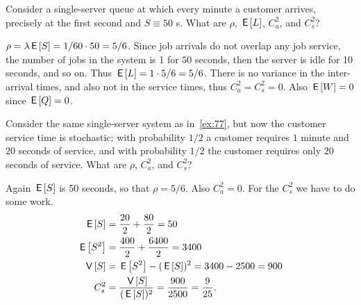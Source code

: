 \begin{exercise}\label{ex:77}
 Consider  a single-server queue at which every minute a customer arrives, precisely at the first second and $S\equiv 50$ s.
 What are $\rho$, $\,\mathsf{E}\left[L\right]$, $C_a^2$, and $C_s^2$?
\begin{solution}
 $\rho = \lambda \,\mathsf{E}\left[S\right] = 1/60 \cdot 50 = 5/6$.
 Since job arrivals do not overlap any job service, the number of jobs in the system is 1 for $50$ seconds, then the server is idle for 10 seconds, and so on.
 Thus $\,\mathsf{E}\left[L\right] = 1\cdot5/6 = 5/6$.
 There is no variance in the inter-arrival times, and also not in the service times, thus $C_a^2 = C_s^2 = 0$.
 Also $\,\mathsf{E}\left[W\right]=0$ since $\,\mathsf{E}\left[Q\right]=0$.
\end{solution}
\end{exercise}

\begin{exercise}\label{ex:76}
 Consider the same single-server system as in~\cref{ex:77}, but now the customer service time is stochastic: with probability $1/2$ a customer requires $1$ minute and $20$ seconds of service, and with probability $1/2$ the customer requires only $20$ seconds of service.
 What are $\rho$, $C_a^2$, and $C_s^2$?
\begin{solution}
 Again $\,\mathsf{E}\left[S\right]$ is 50 seconds, so that $\rho = 5/6$. Also
 $C_a^2=0$. For the $C_s^2$ we have to do some work.
 \begin{equation*}
 \begin{split}
 \,\mathsf{E}\left[S\right] &= \frac{20}2 + \frac{80}2 = 50 \\
 \,\mathsf{E}\left[S^2\right] &= \frac{400}2 + \frac{6400} 2 = 3400 \\
 \,\mathsf{V}\left[S\right] &= \,\mathsf{E}\left[S^2\right] - (\,\mathsf{E}\left[S\right])^2 = 3400 - 2500 = 900 \\
 C_s^2 &= \frac{\,\mathsf{V}\left[S\right]}{(\,\mathsf{E}\left[S\right])^2} = \frac{900}{2500}=\frac{9}{25}.
 \end{split}
 \end{equation*}
\end{solution}
\end{exercise}



